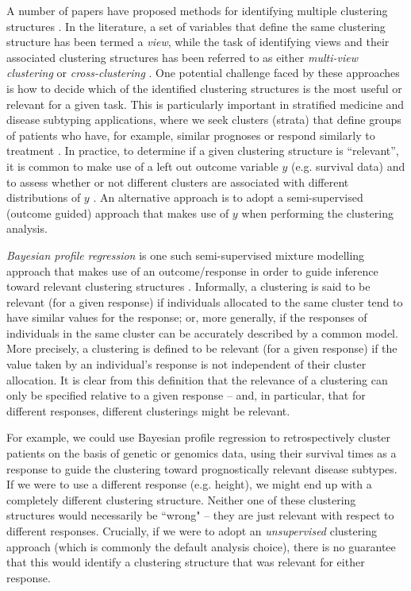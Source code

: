 \documentclass[12pt]{article}
\begin{document}
A number of papers have proposed methods for identifying multiple clustering structures \citep[e.g.][]{Cui2007,Niu2010,Guan2010,Li2011,Niu2014}.  In the literature, a set of variables that define the same clustering structure has been termed a {\em view}, while the task of identifying views and their associated clustering structures has been referred to as either {\em multi-view clustering} \citep{Cui2007} or {\em cross-clustering} \citep{Li2011}.  One potential challenge faced by these approaches is how to decide which of the identified clustering structures is the most useful or relevant for a given task.  This is particularly important in stratified medicine and disease subtyping applications, where we seek clusters (strata) that define groups of patients who have, for example, similar prognoses or respond similarly to treatment \citep[e.g.][]{Perou2000,Sorlie2001}.  In practice, to determine if a given clustering structure is ``relevant'', it is common to make use of a left out outcome variable $y$ (e.g. survival data) and to assess whether or not different clusters are associated with different distributions of $y$ \citep[e.g.][]{Curtis:2012}.  An alternative approach is to adopt a semi-supervised (outcome guided) approach that makes use of $y$ when performing the clustering analysis.     

{\em Bayesian profile regression} is one such semi-supervised mixture modelling approach that makes use of an outcome/response in order to guide inference toward relevant clustering structures \citep{Molitor2010}.  Informally, a clustering is said to be relevant (for a given response) if individuals allocated to the same cluster tend to have similar values for the response; or, more generally, if the responses of individuals in the same cluster can be accurately described by a common model.  More precisely, a clustering is defined to be relevant (for a given response) if the value taken by an individual's response is not independent of their cluster allocation. It is clear from this definition that the relevance of a clustering can only be specified relative to a given response -- and, in particular, that for different responses, different clusterings might be relevant.     

For example, we could use Bayesian profile regression to retrospectively cluster patients on the basis of genetic or genomics data, using their survival times as a response to guide the clustering toward prognostically relevant disease subtypes.  If we were to use a different response (e.g. height), we might end up with a completely different clustering structure.  Neither one of these clustering structures would necessarily be ``wrong" -- they are just relevant with respect to different responses.  Crucially, if we were to adopt an {\em unsupervised} clustering approach (which is commonly the default analysis choice), there is no guarantee that this would identify a clustering structure that was relevant for either response.  
\end{document}
